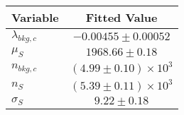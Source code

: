 \begin{tabular}[t]{lc}
\hline
Variable &Fitted Value\\
\hline\hline
$\lambda_{bkg,c}$&$-0.00455\pm0.00052$\\
\hline
$\mu_{S}$&$1968.66\pm0.18$\\
\hline
$n_{bkg,c}$&$(4.99\pm0.10)\times 10^3$\\
\hline
$n_{S}$&$(5.39\pm0.11)\times 10^3$\\
\hline
$\sigma_{S}$&$9.22\pm0.18$\\
\hline
\end{tabular}
